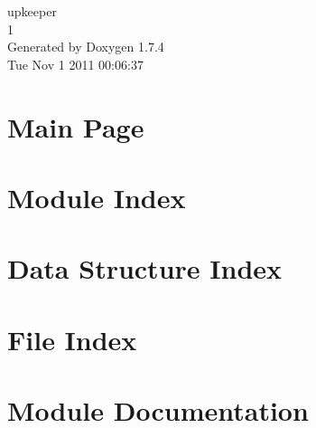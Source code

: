 \documentclass[a4paper]{book}
\begin{document}
\begin{titlepage}
\vspace*{7cm}
\begin{center}
{\Large upkeeper \\[1ex]\large 1 }\\
\vspace*{1cm}
{\large Generated by Doxygen 1.7.4}\\
\vspace*{0.5cm}
{\small Tue Nov 1 2011 00:06:37}\\
\end{center}
\end{titlepage}
\clearemptydoublepage
{}
\tableofcontents
\clearemptydoublepage
{}
\chapter{Main Page}
\label{index}
\chapter{Module Index}

\chapter{Data Structure Index}

\chapter{File Index}

\chapter{Module Documentation}









\end{document}
